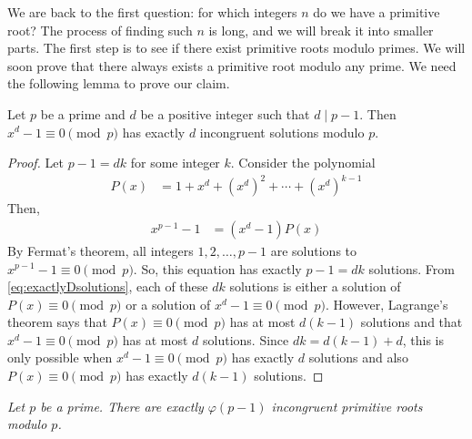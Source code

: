 \documentclass{subfile}
\begin{document}
We are back to the first question: for which integers $n$ do we have a primitive root? The process of finding such $n$ is long, and we will break it into smaller parts. The first step is to see if there exist primitive roots modulo primes. We will soon prove that there always exists a primitive root modulo any prime. We need the following lemma to prove our claim.

	\begin{lemma}\label{lem:exactlyDsolutions}
		Let $p$ be a prime and $d$ be a positive integer such that $d \mid p-1$. Then $x^d -1 \equiv 0 \pmod p$ has exactly $d$ incongruent solutions modulo $p$.
	\end{lemma}

	\begin{proof}
		Let $p-1=dk$ for some integer $k$. Consider the polynomial
			\begin{align*}
				P(x)
					& = 1+x^d + \left(x^d\right)^2 + \cdots + \left(x^d\right)^{k-1}
			\end{align*}
		Then,
			\begin{align}\label{eq:exactlyDsolutions}
				x^{p-1} -1
					& = (x^d-1)P(x)
			\end{align}
		By Fermat's theorem, all integers $1, 2, \ldots, p-1$ are solutions to $x^{p-1}-1 \equiv 0 \pmod p$. So, this equation has exactly $p-1=dk$ solutions. From \eqref{eq:exactlyDsolutions}, each of these $dk$ solutions is either a solution of $P(x) \equiv 0 \pmod p$ or a solution of $x^d-1 \equiv 0 \pmod p$. However, Lagrange's theorem says that $P(x) \equiv 0 \pmod p$ has at most $d(k-1)$ solutions and that $x^d-1 \equiv 0 \pmod p$ has at most $d$ solutions. Since $dk=d(k-1)+d$, this is only possible when $x^d-1 \equiv 0 \pmod p$ has exactly $d$ solutions and also $P(x) \equiv 0 \pmod p$ has exactly $d(k-1)$ solutions.
	\end{proof}

	\begin{theorem}\slshape\label{thm:primeprimitive}
		Let $p$ be a prime. There are exactly $\varphi(p-1)$ incongruent primitive roots modulo $p$.
	\end{theorem}
\end{document}

